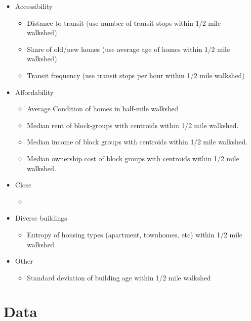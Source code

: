 \documentclass[
]{book}
\providecommand{\tightlist}{%
  \setlength{\itemsep}{0pt}\setlength{\parskip}{0pt}}
\theoremstyle{definition}
\theoremstyle{definition}
\theoremstyle{definition}
\theoremstyle{definition}
\theoremstyle{remark}
\begin{document}
\begin{itemize}
\item
  Accessibility

  \begin{itemize}
  \tightlist
  \item
    Distance to transit (use number of transit stops within 1/2 mile walkshed)
  \item
    Share of old/new homes (use average age of homes within 1/2 mile walkshed)
  \item
    Transit frequency (use transit stops per hour within 1/2 mile walkshed)
  \end{itemize}
\item
  Affordability

  \begin{itemize}
  \tightlist
  \item
    Average Condition of homes in half-mile walkshed
  \item
    Median rent of block-groups with centroids within 1/2 mile walkshed.
  \item
    Median income of block groups with centroids within 1/2 mile walkshed.
  \item
    Median ownership cost of block groups with centroids within 1/2 mile walkshed.
  \end{itemize}
\item
  Close

  \begin{itemize}
  \tightlist
  \item
  \end{itemize}
\item
  Diverse buildings

  \begin{itemize}
  \tightlist
  \item
    Entropy of housing types (apartment, townhomes, etc) within 1/2 mile walkshed
  \end{itemize}
\item
  Other

  \begin{itemize}
  \tightlist
  \item
    Standard deviation of building age within 1/2 mile walkshed
  \end{itemize}
\end{itemize}

\hypertarget{data}{%
\section{Data}\label{data}}
\end{document}
